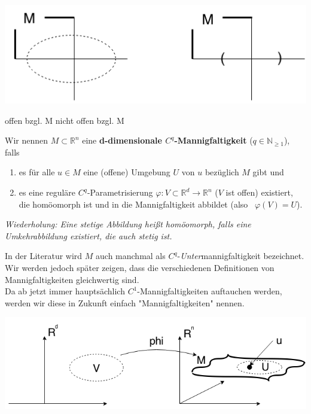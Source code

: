 \begin{center}
\includegraphics[scale=0.5]{pictures/MA2_0007}\\
\end{center}
\hspace{70pt} offen bzgl. M \hspace{70pt} nicht offen bzgl. M\\

\begin{definition}[Mannigfaltigkeiten]
Wir nennen $M\subset\mathbb{R}^n$ eine \textbf{d-dimensionale $C^q$-Mannigfaltigkeit} ($q\in\mathbb{N}_{\geq 1}$), falls

\begin{enumerate}
\item es für alle $u\in M$ eine (offene) Umgebung $U$ von $u$ bezüglich $M$ gibt und
\item es eine reguläre $C^q$-Parametrisierung $\varphi:V\subset\mathbb{R}^d\rightarrow\mathbb{R}^n$ ($V$ ist offen) existiert, die homöomorph ist und in die Mannigfaltigkeit abbildet (also \  $\varphi(V)=U$).
\end{enumerate}

\emph{Wiederholung: Eine stetige Abbildung heißt homöomorph, falls eine Umkehrabbildung existiert, die auch stetig ist.}\\
\end{definition}

In der Literatur wird $M$ auch manchmal als $C^q$-\emph{Unter}mannigfaltigkeit bezeichnet. Wir werden jedoch später zeigen, dass die verschiedenen Definitionen von Mannigfaltigkeiten gleichwertig sind.\\
Da ab jetzt immer hauptsächlich $C^1$-Mannigfaltigkeiten auftauchen werden, werden wir diese in Zukunft einfach "Mannigfaltigkeiten" nennen.\\

\begin{center}
\includegraphics[scale=0.5]{pictures/MA2_0008}\\
\end{center}

